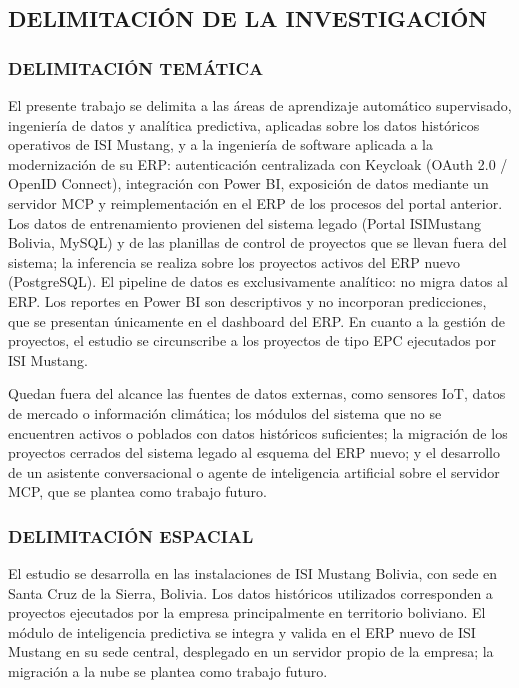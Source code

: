 \subsection{DELIMITACIÓN DE LA INVESTIGACIÓN}

\subsubsection{DELIMITACIÓN TEMÁTICA}

El presente trabajo se delimita a las áreas de aprendizaje automático supervisado, ingeniería de datos y analítica predictiva, aplicadas sobre los datos históricos operativos de ISI Mustang, y a la ingeniería de software aplicada a la modernización de su ERP: autenticación centralizada con Keycloak (OAuth 2.0 / OpenID Connect), integración con Power BI, exposición de datos mediante un servidor MCP y reimplementación en el ERP de los procesos del portal anterior. Los datos de entrenamiento provienen del sistema legado (Portal ISIMustang Bolivia, MySQL) y de las planillas de control de proyectos que se llevan fuera del sistema; la inferencia se realiza sobre los proyectos activos del ERP nuevo (PostgreSQL). El pipeline de datos es exclusivamente analítico: no migra datos al ERP. Los reportes en Power BI son descriptivos y no incorporan predicciones, que se presentan únicamente en el dashboard del ERP. En cuanto a la gestión de proyectos, el estudio se circunscribe a los proyectos de tipo EPC ejecutados por ISI Mustang.

Quedan fuera del alcance las fuentes de datos externas, como sensores IoT, datos de mercado o información climática; los módulos del sistema que no se encuentren activos o poblados con datos históricos suficientes; la migración de los proyectos cerrados del sistema legado al esquema del ERP nuevo; y el desarrollo de un asistente conversacional o agente de inteligencia artificial sobre el servidor MCP, que se plantea como trabajo futuro.

\subsubsection{DELIMITACIÓN ESPACIAL}

El estudio se desarrolla en las instalaciones de ISI Mustang Bolivia, con sede en Santa Cruz de la Sierra, Bolivia. Los datos históricos utilizados corresponden a proyectos ejecutados por la empresa principalmente en territorio boliviano. El módulo de inteligencia predictiva se integra y valida en el ERP nuevo de ISI Mustang en su sede central, desplegado en un servidor propio de la empresa; la migración a la nube se plantea como trabajo futuro.


